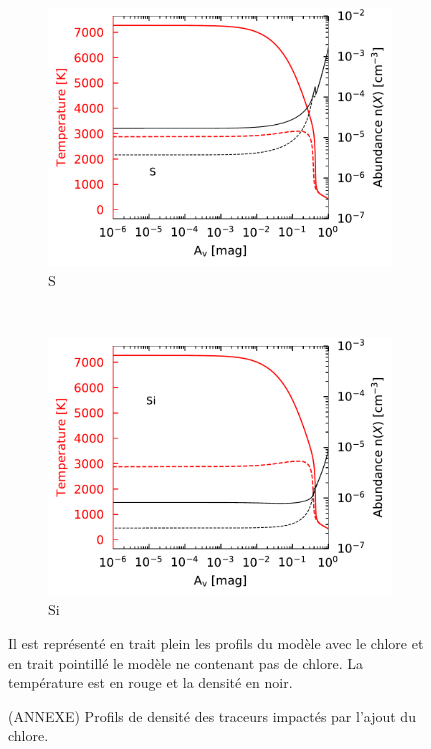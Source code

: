 \begin{appendices}
\begin{figure}[!htbp]
    \begin{subfigure}[t]{0.49\textwidth} %
        \centering \includegraphics[trim = {0 0 0 0},clip,width=1\textwidth]{figure/Cl/gridModelEmiss/nT_comp_S.pdf}
        \caption{$\mathrm{S}$}
    \end{subfigure}
    ~
    \begin{subfigure}[t]{0.49\textwidth} %
        \centering \includegraphics[trim = {0 0 0 0},clip,width=1\textwidth]{figure/Cl/gridModelEmiss/nT_comp_Si.pdf}
        \caption{$\mathrm{Si}$}
    \end{subfigure}
    
    \caption{(ANNEXE) Profils de densité des traceurs impactés par l'ajout du chlore.}
    \begin{minipage}{\textwidth}
    Il est représenté en trait plein les profils du modèle avec le chlore et en trait pointillé le modèle ne contenant pas de chlore. La température est en rouge et la densité en noir.
    \end{minipage}
    \label{fig:Cl:gridModelEmiss:nT:yes}
\end{figure}


\end{appendices}
